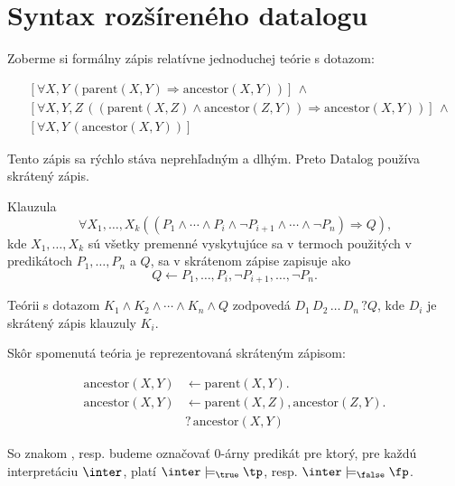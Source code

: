 \section{Syntax rozšíreného datalogu}
Zoberme si formálny zápis relatívne jednoduchej teórie s dotazom:
\begin{priklad}
    \begin{align*}
        & [\forall X, Y \, (\text{parent}(X, Y) \Rightarrow \text{ancestor}(X, Y))] \, \land\\
        & [\forall X, Y, Z \, ((\text{parent}(X, Z) \land \text{ancestor}(Z, Y)) \Rightarrow \text{ancestor}(X, Y))] \, \land\\
        & [\forall X, Y \, (\text{ancestor}(X, Y))]
    \end{align*}
\end{priklad}

Tento zápis sa rýchlo stáva neprehľadným a dlhým. Preto Datalog používa skrátený zápis. 

Klauzula
$$\forall X_1, \dots, X_k ((P_1 \land \cdots \land P_i \land \lnot P_{i+1} \land \cdots \land \lnot
P_n) \Rightarrow Q)\text{,}$$ kde $X_1, \dots, X_k$ sú všetky premenné vyskytujúce sa v termoch
použitých v predikátoch $P_1, \dots, P_n$ a $Q$, sa v skrátenom zápise zapisuje ako
$$Q \leftarrow P_1, \dots, P_i, \lnot P_{i+1}, \dots, \lnot P_n.$$

Teórii s dotazom $K_1 \land K_2 \land \cdots \land K_n \land Q$ zodpovedá $D_1 \, D_2 \, \dots \,
D_n \, ? Q$, kde $D_i$ je skrátený zápis klauzuly $K_i$.

Skôr spomenutá teória je reprezentovaná skráteným zápisom:
\begin{priklad}
    \begin{align*}
        \text{ancestor}(X, Y) & \leftarrow \text{parent}(X, Y).\\
        \text{ancestor}(X, Y) & \leftarrow \text{parent}(X, Z), \text{ancestor}(Z, Y).\\
        & ? \, \text{ancestor}(X, Y)
    \end{align*}
\end{priklad}

\begin{note}
So znakom \tp, resp. \fp budeme označovať 0-árny predikát pre ktorý, pre každú interpretáciu
$\inter$, platí $\inter \models_\true \tp$, resp. $\inter \models_\false \fp$.
\end{note}

